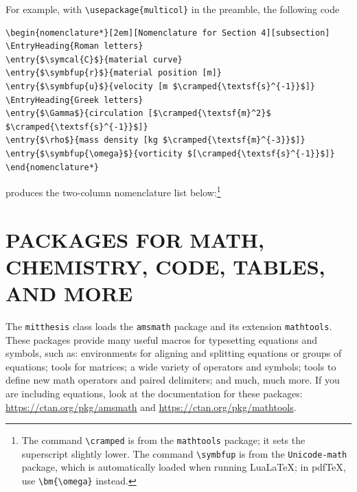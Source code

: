 \documentclass[11pt]{article}
\begin{document}
For example, with \verb+\usepackage{multicol}+ in the preamble, the following code 
{\small
\begin{center}
\begin{minipage}{0.85\textwidth}
\begin{verbatim}
\begin{nomenclature*}[2em][Nomenclature for Section 4][subsection]
\EntryHeading{Roman letters}
\entry{$\symcal{C}$}{material curve}
\entry{$\symbfup{r}$}{material position [m]}
\entry{$\symbfup{u}$}{velocity [m $\cramped{\textsf{s}^{-1}}$]}
\EntryHeading{Greek letters}
\entry{$\Gamma$}{circulation [$\cramped{\textsf{m}^2}$ $\cramped{\textsf{s}^{-1}}$]}
\entry{$\rho$}{mass density [kg $\cramped{\textsf{m}^{-3}}$]}
\entry{$\symbfup{\omega}$}{vorticity $[\cramped{\textsf{s}^{-1}}$]}
\end{nomenclature*}
\end{verbatim}
\end{minipage}
\end{center}
}
produces the two-column nomenclature list below:\footnote{The command \texttt{\textbackslash cramped} is from the \texttt{mathtools} package; it sets the superscript slightly lower. The command \texttt{\textbackslash symbfup} is from the \texttt{Unicode-math} package, which is automatically loaded when running LuaLaTeX; in pdfTeX, use \texttt{\textbackslash bm\{\textbackslash omega\}} instead.}

\begin{nomenclature*}
\end{nomenclature*}


\section{PACKAGES FOR MATH, CHEMISTRY, CODE, TABLES, AND MORE}

The \texttt{mitthesis} class loads the \texttt{amsmath} package and its extension \texttt{mathtools}. These packages provide many useful macros for typesetting equations and symbols, such as: environments for aligning and splitting equations or groups of equations; tools for matrices; a wide variety of operators and symbols; tools to define new math operators and paired delimiters; and much, much more. If you are including equations, look at the documentation for these packages: \url{https://ctan.org/pkg/amsmath} and \url{https://ctan.org/pkg/mathtools}.
\end{document}
